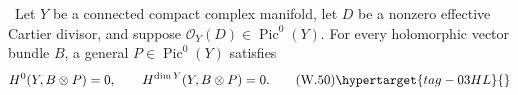 
\begin{lemma}\hypertarget{tag-03I7}{}\label{wbII:lem:cdp-generic-endpoints}


\ Let \(Y\) be a connected compact complex manifold, let \(D\) be
a nonzero effective Cartier divisor, and suppose
\(\mathcal O_Y(D)\in\operatorname{Pic}^0(Y)\).  For every holomorphic vector
bundle \(B\), a general \(P\in\operatorname{Pic}^0(Y)\) satisfies
\[
 H^0(Y,B\otimes P)=0,\qquad
 H^{\dim Y}(Y,B\otimes P)=0.
\tag{W.50}\hypertarget{tag-03HL}{}\label{wbII:eq:W:5.23}
\]
\end{lemma}

